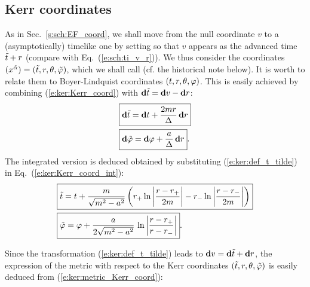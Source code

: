 \subsection{Kerr coordinates} \label{s:ker:3p1_Kerr_coord}

As in Sec.~\ref{s:sch:EF_coord},
we shall move from the null coordinate $v$ to a (asymptotically)
timelike one by setting
\be \label{e:ker:def_t_tilde}
     \iff {}
\ee
so that $v$ appears as the advanced time ${\tilde t}+r$ (compare with Eq.~(\ref{e:sch:ti_v_r})). We thus consider
the coordinates $(x^{\tilde{\alpha}}) = ({\tilde t}, r, \theta,{\tilde\varphi})$,
which we shall call
(cf. the historical note below).
It is worth to relate them to Boyer-Lindquist coordinates
$(t,r,\theta,\varphi)$. This is easily achieved
by combining (\ref{e:ker:Kerr_coord}) with $\mathbf{d}{\tilde t} = \mathbf{d} v - \mathbf{d} r$:
\begin{subequations}
\label{e:ker:Kerr_3p1_BL}
\begin{align}
& \fbox{$\displaystyle \mathbf{d} {\tilde t} = \mathbf{d} t + \frac{2m r}{\Delta} \, \mathbf{d} r$} \\
& \fbox{$\displaystyle \mathbf{d} {\tilde\varphi} = \mathbf{d} \varphi + \frac{a}{\Delta}\, \mathbf{d} r$} .
\end{align}
\end{subequations}
The integrated version is deduced obtained by substituting (\ref{e:ker:def_t_tilde}) in
Eq.~(\ref{e:ker:Kerr_coord_int}):
\begin{subequations}
\label{e:ker:Kerr_3p1_BL_int}
\begin{align}
& \fbox{$\displaystyle {\tilde t} = t  + \frac{m}{\sqrt{m^2-a^2}} \left(
    r_+ \ln\left| \frac{r-r_+}{2m} \right|
    - r_- \ln\left| \frac{r-r_-}{2m} \right| \right) $} \label{e:ker:ti_t}\\
& \fbox{$\displaystyle  {\tilde\varphi} = \varphi + \frac{a}{2\sqrt{m^2-a^2}}\, \ln \left|
    \frac{r-r_+}{r-r_-} \right| $} .
\end{align}
\end{subequations}


Since the transformation (\ref{e:ker:def_t_tilde}) leads to $\mathbf{d} v = \mathbf{d}{\tilde t} + \mathbf{d} r$,
the expression of the metric with respect to the
Kerr coordinates $({\tilde t},r,\theta,{\tilde\varphi})$ is easily deduced from
(\ref{e:ker:metric_Kerr_coord}):
\be \label{e:ker:metric_Kerr_3p1}
\ee

